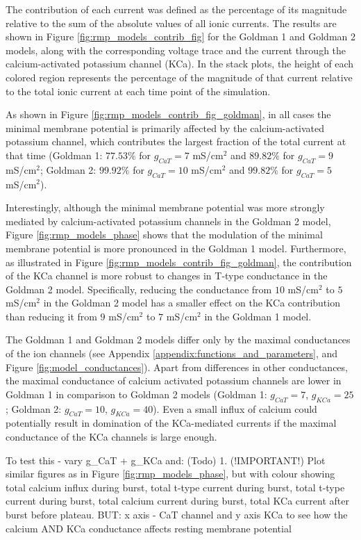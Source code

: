 \documentclass[../main.tex]{subfiles}
\begin{document}
The contribution of each current was defined as the percentage of its magnitude relative to the sum of the absolute values of all ionic currents. The results are shown in Figure \ref{fig:rmp_models_contrib_fig} for the Goldman 1 and Goldman 2 models, along with the corresponding voltage trace and the current through the calcium-activated potassium channel (KCa). In the stack plots, the height of each colored region represents the percentage of the magnitude of that current relative to the total ionic current at each time point of the simulation.


As shown in Figure \ref{fig:rmp_models_contrib_fig_goldman}, in all cases the minimal membrane potential is primarily affected by the calcium-activated potassium channel, which contributes the largest fraction of the total current at that time (Goldman 1: $77.53\%$ for $g_{CaT}=7$ mS/cm$^2$ and $89.82\%$ for $g_{CaT}=9$ mS/cm$^2$; Goldman 2: $99.92\%$ for $g_{CaT}=10$ mS/cm$^2$ and $99.82\%$ for $g_{CaT}=5$ mS/cm$^2$).

Interestingly, although the minimal membrane potential was more strongly mediated by calcium-activated potassium channels in the Goldman 2 model, Figure \ref{fig:rmp_models_phase} shows that the modulation of the minimal membrane potential is more pronounced in the Goldman 1 model. Furthermore, as illustrated in Figure \ref{fig:rmp_models_contrib_fig_goldman}, the contribution of the KCa channel is more robust to changes in T-type conductance in the Goldman 2 model. Specifically, reducing the conductance from $10$ mS/cm$^2$ to $5$ mS/cm$^2$ in the Goldman 2 model has a smaller effect on the KCa contribution than reducing it from $9$ mS/cm$^2$ to $7$ mS/cm$^2$ in the Goldman 1 model.

The Goldman 1 and Goldman 2 models differ only by the maximal conductances of the ion channels (see Appendix \ref{appendix:functions_and_parameters}, and Figure \ref{fig:model_conductances}). Apart from differences in other conductances, the maximal conductance of calcium activated potassium channels are lower in Goldman 1 in comparison to Goldman 2 models (Goldman 1: $g_{CaT}=7$, $g_{KCa}=25$; Goldman 2: $g_{CaT}=10$, $g_{KCa}=40$). Even a small influx of calcium could potentially result in domination of the KCa-mediated currents if the maximal conductance of the KCa channels is large enough.

\color{red}

To test this - vary g\_CaT + g\_KCa and: (Todo) 1. (!IMPORTANT!) Plot similar figures as in Figure \ref{fig:rmp_models_phase}, but with colour showing total calcium influx during burst, total t-type current during burst, total t-type current during burst, total calcium current during burst, total KCa current after burst before plateau.
BUT: x axis - CaT channel and y axis KCa to see how the calcium AND KCa conductance affects resting membrane potential
\end{document}
